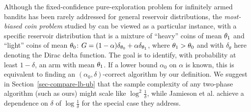 Although the fixed-confidence pure-exploration problem for infinitely armed 
bandits has been rarely addressed
for general reservoir distributions, the \emph{most-biased
coin problem} studied by \cite{DBLP:journals/corr/abs-1202-3639,
Jamieson:2016wd} can be viewed as a particular
instance, with a specific reservoir distribution that is a mixture of
``heavy'' coins of mean $\theta_1$ and ``light'' coins
of mean $\theta_0$: $G = (1-\alpha)\delta_{\theta_0} + \alpha
\delta_{\theta_1}$, where $\theta_1 > \theta_0$
and with $\delta_\theta$ here denoting the Dirac delta function. The goal is to
identify, with probability at least $1-\delta$, an arm with mean
$\theta_1$. If a lower bound $\alpha_0$ on $\alpha$ is known, this
is equivalent to finding an $(\alpha_0,\delta)$-correct algorithm
by our definition.
We suggest in Section~\ref{sec-compare-lb-ub} that the
sample complexity of any two-phase algorithm (such as ours) might scale like $\log^2 \frac{1}{\delta}$, while Jamieson et al. achieve
a dependence on $\delta$ of $\log \frac{1}{\delta}$ for the special case they address.

